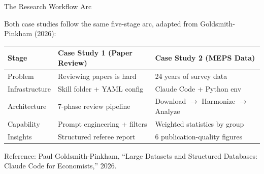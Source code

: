 \documentclass[10pt,english,aspectratio=169]{beamer}
\begin{document}
\begin{frame}{The Research Workflow Arc}

Both case studies follow the same five-stage arc, adapted from Goldsmith-Pinkham (2026):

\vspace{0.4cm}
\begin{center}
\end{center}

\vspace{0.3cm}
\begin{small}
\begin{tabular}{lll}
\toprule
\textbf{Stage} & \textbf{Case Study 1 (Paper Review)} & \textbf{Case Study 2 (MEPS Data)} \\
\midrule
Problem & Reviewing papers is hard & 24 years of survey data \\
Infrastructure & Skill folder + YAML config & Claude Code + Python env \\
Architecture & 7-phase review pipeline & Download $\to$ Harmonize $\to$ Analyze \\
Capability & Prompt engineering + filters & Weighted statistics by group \\
Insights & Structured referee report & 6 publication-quality figures \\
\bottomrule
\end{tabular}
\end{small}

\vspace{0.2cm}
{\footnotesize Reference: Paul Goldsmith-Pinkham, ``Large Datasets and Structured Databases: Claude Code for Economists,'' 2026.}

\end{frame}
\end{document}
